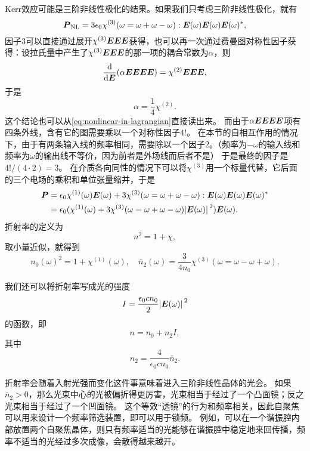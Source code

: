 Kerr效应可能是三阶非线性极化的结果。如果我们只考虑三阶非线性极化，就有
\[
    \vb*{P}_\text{NL} = 3 \epsilon_0 \chi^{(3)}(\omega=\omega + \omega - \omega) : \vb*{E}(\omega) \vb*{E}(\omega) \vb*{E}(\omega)^*,
\]
因子$3$可以直接通过展开$\chi^{(3)} \vb*{E} \vb*{E} \vb*{E}$获得，也可以再一次通过费曼图对称性因子获得：设拉氏量中产生了$\chi^{(3)} \vb*{E} \vb*{E} \vb*{E}$的那一项的耦合常数为$\alpha$，则
\[
    \dv{\vb*{E}} (\alpha \vb*{E} \vb*{E} \vb*{E} \vb*{E}) = \chi^{(2)} \vb*{E} \vb*{E} \vb*{E},
\]
于是
\[
    \alpha = \frac{1}{4} \chi^{(2)}.
\]
这个结论也可以从\eqref{eq:nonlinear-in-lagrangian}直接读出来。
而由于$\alpha \vb*{E} \vb*{E} \vb*{E} \vb*{E}$项有四条外线，含有它的图需要乘以一个对称性因子$4!$。
在本节的自相互作用的情况下，由于有两条输入线的频率相同，需要除以一个因子$2$。（频率为$-\omega$的输入线和频率为$\omega$的输出线不等价，因为前者是外场线而后者不是）
于是最终的因子是$4! / (4 \cdot 2) = 3$。
在介质各向同性的情况下可以将$\chi^{(3)}$用一个标量代替，它后面的三个电场的乘积和单位张量缩并，于是
\[
    \begin{aligned}
        \vb*{P} &= \epsilon_0 \chi^{(1)}(\omega) \vb*{E}(\omega) +  3 \chi^{(3)}(\omega=\omega + \omega - \omega) : \vb*{E}(\omega) \vb*{E}(\omega) \vb*{E}(\omega)^* \\
        &= \epsilon_0 (\chi^{(1)}(\omega) + 3 \chi^{(3)}(\omega=\omega+\omega-\omega) \abs*{\vb*{E}(\omega)}^2) \vb*{E}(\omega).
    \end{aligned}
\]
折射率的定义为
\[
    n^2 = 1 + \chi,
\]
取小量近似，就得到
\begin{equation}
    n_0(\omega)^2 = 1 + \chi^{(1)}(\omega), \quad \bar{n}_2(\omega) = \frac{3}{4n_0} \chi^{(3)}(\omega=\omega-\omega+\omega).
\end{equation}

我们还可以将折射率写成光的强度
\begin{equation}
    I = \frac{\epsilon_0 c n_0}{2} \abs*{\vb*{E}(\omega)}^2
\end{equation}
的函数，即
\begin{equation}
    n = n_0 + n_2 I,
    \label{eq:reflective-index-indensity-dependence}
\end{equation}
其中
\begin{equation}
    n_2 = \frac{4}{\epsilon_0 c n_0} \bar{n}_2.
\end{equation}

折射率会随着入射光强而变化这件事意味着进入三阶非线性晶体的光会。
如果$\bar{n}_2 > 0$，那么光束中心的光被偏折得更厉害，光束相当于经过了一个凸面镜；反之光束相当于经过了一个凹面镜。
这个等效“透镜”的行为和频率相关，因此自聚焦可以用来设计一个频率筛选装置，即可以用于锁频。
例如，可以在一个谐振腔内部放置两个自聚焦晶体，则只有频率适当的光能够在谐振腔中稳定地来回传播，频率不适当的光经过多次成像，会散得越来越开。

